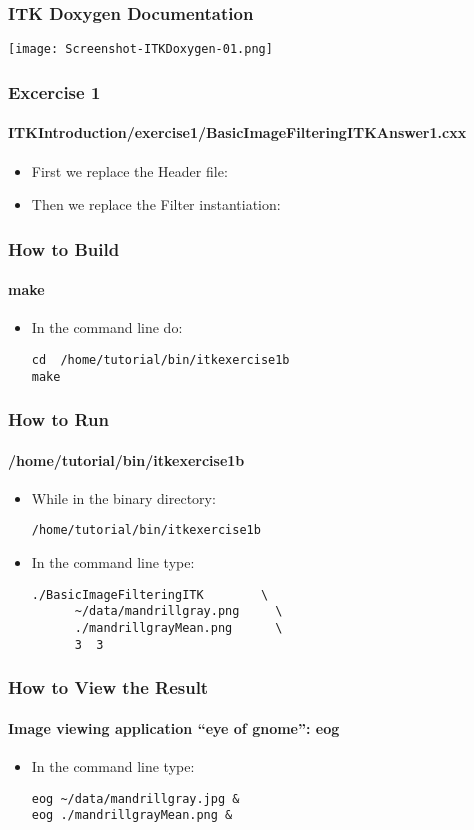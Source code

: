 \begin{frame}[fragile]
\frametitle{ITK Doxygen Documentation}
\begin{center}
  \texttt{[image: Screenshot-ITKDoxygen-01.png]}
\end{center}
\end{frame}

\begin{frame}
\frametitle{Excercise 1}
\framesubtitle{ITKIntroduction/exercise1/BasicImageFilteringITKAnswer1.cxx}
\begin{itemize}
\item First we replace the Header file:
\pause
\item Then we replace the Filter instantiation:
\end{itemize}
\end{frame}

\begin{frame}[fragile]
\frametitle{How to Build}
\framesubtitle{make}
\begin{itemize}
\item In the command line do:
\begin{verbatim}
cd  /home/tutorial/bin/itkexercise1b
make
\end{verbatim}
\end{itemize}
\end{frame}

\begin{frame}[fragile]
\frametitle{How to Run}
\framesubtitle{/home/tutorial/bin/itkexercise1b}
\begin{itemize}
\item While in the binary directory:
\begin{verbatim}
/home/tutorial/bin/itkexercise1b
\end{verbatim}
\item In the command line type:
\begin{verbatim}
./BasicImageFilteringITK        \
      ~/data/mandrillgray.png     \
      ./mandrillgrayMean.png      \
      3  3
\end{verbatim}
\end{itemize}
\end{frame}

\begin{frame}[fragile]
\frametitle{How to View the Result}
\framesubtitle{Image viewing application ``eye of gnome'': eog}
\begin{itemize}
\item In the command line type:
\begin{verbatim}
eog ~/data/mandrillgray.jpg &
eog ./mandrillgrayMean.png &
\end{verbatim}
\end{itemize}
\end{frame}

